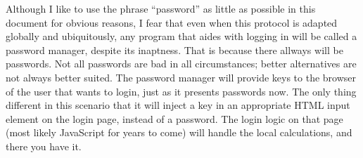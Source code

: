 Although I like to use the phrase ``password'' as little as possible in this document for obvious reasons,
I fear that even when this protocol is adapted globally and ubiquitously,
any program that aides with logging in will be called a password manager,
despite its inaptness.
That is because there allways will be passwords.
Not all passwords are bad in all circumstances; better alternatives are not always better suited.
The password manager will provide keys to the browser of the user that wants to login, just as it presents passwords now.
The only thing different in this scenario that it will inject a key in an appropriate HTML input element on the login page, instead of a password.
The login logic on that page (most likely JavaScript for years to come) will handle the local calculations, and there you have it.
